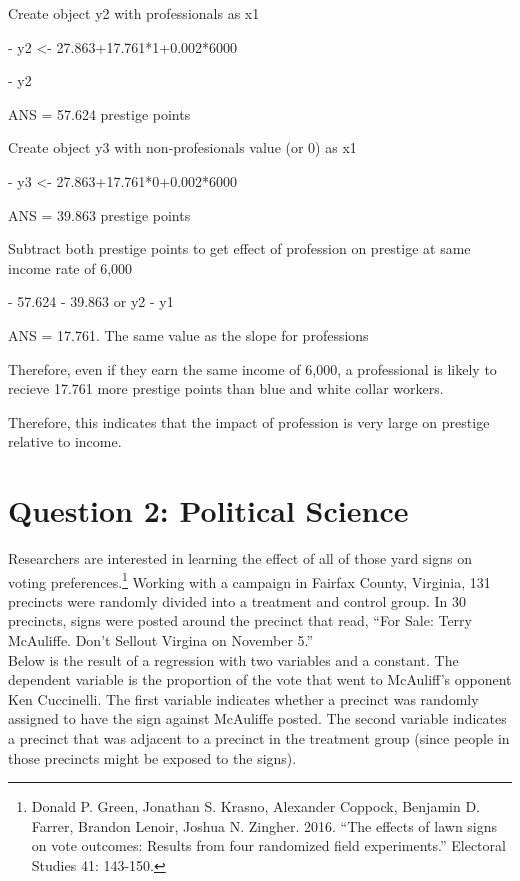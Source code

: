 \documentclass[12pt,letterpaper]{article}
\begin{document}
\begin{enumerate}
Create object y2 with professionals as x1

- y2 <- 27.863+17.761*1+0.002*6000

-	y2  

ANS = 57.624 prestige points 

Create object y3 with non-profesionals value (or 0) as x1

- y3 <- 27.863+17.761*0+0.002*6000 

ANS = 39.863 prestige points

Subtract both prestige points to get effect of profession on prestige at same income rate of 6,000

-	57.624 - 39.863 or y2 - y1

ANS = 17.761. The same value as the slope for professions

Therefore, even if they earn the same income of 6,000, a professional is likely to recieve 17.761 more prestige points than blue and white collar workers. 

Therefore, this indicates that the impact of profession is very large on prestige relative to income. 
	
	
\end{enumerate}

\newpage

\section*{Question 2: Political Science}
\vspace{.25cm}
\noindent 	Researchers are interested in learning the effect of all of those yard signs on voting preferences.\footnote{Donald P. Green, Jonathan	S. Krasno, Alexander Coppock, Benjamin D. Farrer,	Brandon Lenoir, Joshua N. Zingher. 2016. ``The effects of lawn signs on vote outcomes: Results from four randomized field experiments.'' Electoral Studies 41: 143-150. } Working with a campaign in Fairfax County, Virginia, 131 precincts were randomly divided into a treatment and control group. In 30 precincts, signs were posted around the precinct that read, ``For Sale: Terry McAuliffe. Don't Sellout Virgina on November 5.'' \\

Below is the result of a regression with two variables and a constant.  The dependent variable is the proportion of the vote that went to McAuliff's opponent Ken Cuccinelli. The first variable indicates whether a precinct was randomly assigned to have the sign against McAuliffe posted. The second variable indicates
a precinct that was adjacent to a precinct in the treatment group (since people in those precincts might be exposed to the signs).  \\
\end{document}
